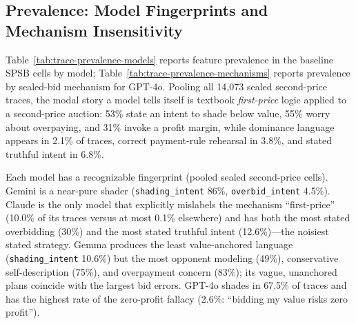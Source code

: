 \subsection{Prevalence: Model Fingerprints and Mechanism Insensitivity}\label{app:traces-prevalence}

Table~\ref{tab:trace-prevalence-models} reports feature prevalence in the baseline SPSB cells by model; Table~\ref{tab:trace-prevalence-mechanisms} reports prevalence by sealed-bid mechanism for GPT-4o. Pooling all 14{,}073 sealed second-price traces, the modal story a model tells itself is textbook \emph{first-price} logic applied to a second-price auction: 53\% state an intent to shade below value, 55\% worry about overpaying, and 31\% invoke a profit margin, while dominance language appears in 2.1\% of traces, correct payment-rule rehearsal in 3.8\%, and stated truthful intent in 6.8\%.

Each model has a recognizable fingerprint (pooled sealed second-price cells). Gemini is a near-pure shader (\texttt{shading\_intent} 86\%, \texttt{overbid\_intent} 4.5\%). Claude is the only model that explicitly mislabels the mechanism ``first-price'' (10.0\% of its traces versus at most 0.1\% elsewhere) and has both the most stated overbidding (30\%) and the most stated truthful intent (12.6\%)---the noisiest stated strategy. Gemma produces the least value-anchored language (\texttt{shading\_intent} 10.6\%) but the most opponent modeling (49\%), conservative self-description (75\%), and overpayment concern (83\%); its vague, unanchored plans coincide with the largest bid errors. GPT-4o shades in 67.5\% of traces and has the highest rate of the zero-profit fallacy (2.6\%: ``bidding my value risks zero profit'').

